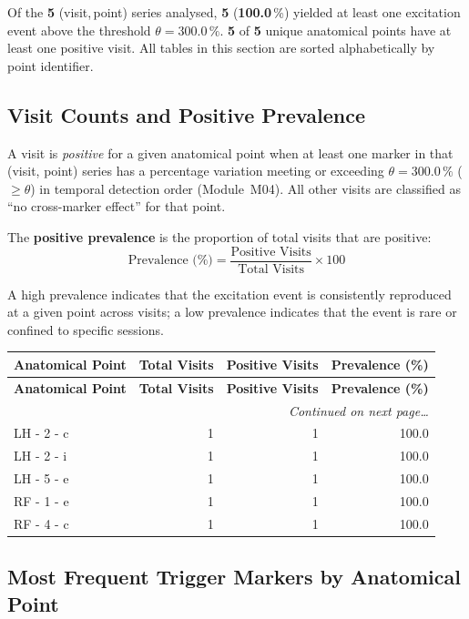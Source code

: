 \documentclass[a4paper,11pt]{article}
\begin{document}
\noindent
Of the \textbf{5} (visit,\,point) series analysed,
\textbf{5} (\textbf{100.0}\,\%) yielded at least one
excitation event above the threshold $\theta = 300.0\,\%$.
\textbf{5} of \textbf{5} unique anatomical points
have at least one positive visit.
All tables in this section are sorted alphabetically by point identifier.

\subsection{Visit Counts and Positive Prevalence}

A visit is \emph{positive} for a given anatomical point when at least one marker in that
(visit, point) series has a percentage variation meeting or exceeding
$\theta = 300.0\,\%$ ($\geq \theta$) in temporal detection order (Module~M04).
All other visits are classified as ``no cross-marker effect'' for that point.

The \textbf{positive prevalence} is the proportion of total visits that are positive:
\[
  \text{Prevalence (\%)} = \frac{\text{Positive Visits}}{\text{Total Visits}} \times 100
\]

A high prevalence indicates that the excitation event is consistently reproduced at a given
point across visits; a low prevalence indicates that the event is rare or confined to
specific sessions.

\begin{small}
\begin{longtable}{p{5cm}rrr}
\toprule
\textbf{Anatomical Point} &
\textbf{Total Visits} &
\textbf{Positive Visits} &
\textbf{Prevalence (\%)} \\
\midrule
\endfirsthead
\toprule
\textbf{Anatomical Point} &
\textbf{Total Visits} &
\textbf{Positive Visits} &
\textbf{Prevalence (\%)} \\
\midrule
\endhead
\midrule
\multicolumn{4}{r}{\small\emph{Continued on next page\ldots}} \\
\endfoot
\bottomrule
\endlastfoot
LH - 2 - c & 1 & 1 & 100.0 \\
LH - 2 - i & 1 & 1 & 100.0 \\
LH - 5 - e & 1 & 1 & 100.0 \\
RF - 1 - e & 1 & 1 & 100.0 \\
RF - 4 - c & 1 & 1 & 100.0 \\
\end{longtable}
\end{small}

\subsection{Most Frequent Trigger Markers by Anatomical Point}
\end{document}
